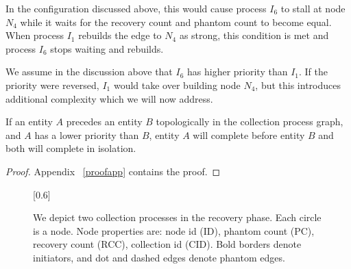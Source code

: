 In the configuration discussed above, this would cause process $I_6$ to stall at
node $N_4$ while it waits for the recovery count and phantom count to become
equal. When process $I_1$ rebuilds the edge to $N_4$ as strong, this condition
is met and process $I_6$ stops waiting and rebuilds.

We assume in the discussion above that $I_6$ has higher priority than $I_1$. If the priority
were reversed, $I_1$ would take over building node $N_4$, but this
introduces additional complexity which we will now address.

\begin{lemma}
If an entity $A$ precedes an entity $B$ topologically in the collection process graph, and
$A$ has a lower priority than $B$, entity $A$ will complete before entity $B$ and both will
complete in isolation.
\label{lem:ordered}
\end{lemma}
\begin{proof}
Appendix ~\ref{proofapp} contains the proof.
\end{proof}

\begin{figure}
\begin{center}
\scalebox{0.6}[0.6]{}
\caption{We depict two collection processes in the recovery phase.
 Each circle is a node.
Node properties are: node id (ID),
phantom count (PC), recovery count (RCC), collection id (CID). Bold borders denote
initiators, and dot and dashed edges denote phantom edges.
}
\label{fig:recoverycount}
\end{center}
\vspace{-8mm}
\end{figure}

